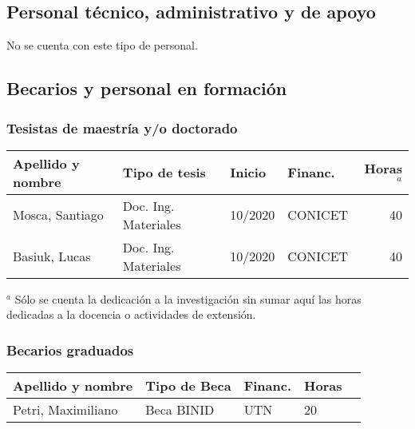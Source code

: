 \documentclass[a4paper,11pt,twoside,final,titlepage,onecolumn,openright]{report}
\begin{document}
\subsection{Personal técnico, administrativo y de apoyo}
No se cuenta con este tipo de personal.


\subsection{Becarios y personal en formación}

\subsubsection{Tesistas de maestría y/o doctorado}
\begin{tabular}{l l l l r}
\toprule
Apellido y nombre & Tipo de tesis & Inicio & Financ. & Horas$^a$ \\
\midrule
Mosca, Santiago & Doc. Ing. Materiales & 10/2020 &  CONICET & 40\\
Basiuk, Lucas & Doc. Ing. Materiales & 10/2020 &  CONICET & 40 \\
\bottomrule
\end{tabular}

\normalsize
\vspace{0.5cm}
$^a$ Sólo se cuenta la dedicación a la investigación sin sumar aquí las horas dedicadas a la docencia o actividades de extensión.

\subsubsection{Becarios graduados}

 \begin{tabular}{l l l l r}
 \toprule
 Apellido y nombre & Tipo de Beca & Financ. & Horas \\
 \midrule
 Petri, Maximiliano & Beca BINID & UTN & 20\\
 \bottomrule 
 \end{tabular}
\end{document}
